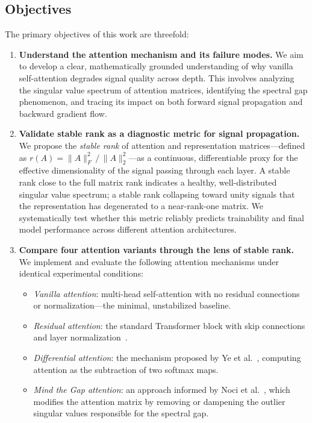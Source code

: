 \documentclass[12pt, a4paper]{article}
\begin{document}
\subsection{Objectives}

The primary objectives of this work are threefold:

\begin{enumerate}[label=\textbf{\arabic*.}, leftmargin=2em]
    \item \textbf{Understand the attention mechanism and its failure modes.}
    We aim to develop a clear, mathematically grounded understanding of why
    vanilla self-attention degrades signal quality across depth. This involves
    analyzing the singular value spectrum of attention matrices, identifying
    the spectral gap phenomenon, and tracing its impact on both forward signal
    propagation and backward gradient flow.

    \item \textbf{Validate stable rank as a diagnostic metric for signal
    propagation.}
    We propose the \textit{stable rank} of attention and representation
    matrices---defined as $r(A) = \|A\|_F^2 \,/\, \|A\|_2^2$---as a
    continuous, differentiable proxy for the effective dimensionality of
    the signal passing through each layer. A stable rank close to the full
    matrix rank indicates a healthy, well-distributed singular value spectrum;
    a stable rank collapsing toward unity signals that the representation
    has degenerated to a near-rank-one matrix. We systematically test whether
    this metric reliably predicts trainability and final model performance
    across different attention architectures.

    \item \textbf{Compare four attention variants through the lens of stable
    rank.}
    We implement and evaluate the following attention mechanisms under
    identical experimental conditions:
    \begin{itemize}[leftmargin=1.5em]
        \item \textit{Vanilla attention}: multi-head self-attention with no
              residual connections or normalization---the minimal, unstabilized
              baseline.
        \item \textit{Residual attention}: the standard Transformer block with
              skip connections and layer normalization~\cite{ba2016layernorm}.
        \item \textit{Differential attention}: the mechanism proposed by
              Ye et al.~\cite{diff_transformer}, computing attention as the
              subtraction of two softmax maps.
        \item \textit{Mind the Gap attention}: an approach informed by
              Noci et al.~\cite{mind_the_gap}, which modifies the attention
              matrix by removing or dampening the outlier singular values
              responsible for the spectral gap.
    \end{itemize}
\end{enumerate}
\end{document}
